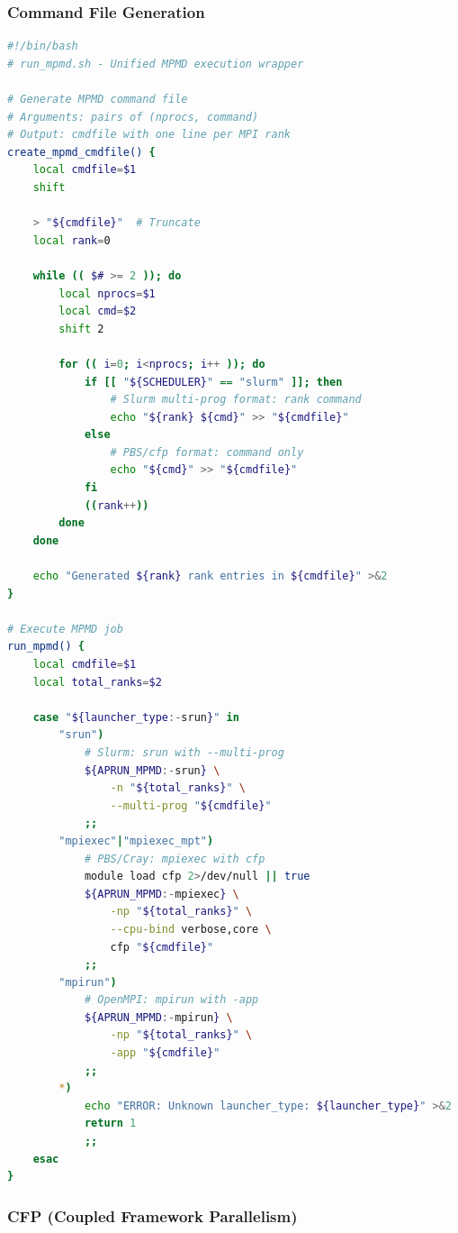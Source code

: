 \documentclass[11pt,twoside]{article}
\begin{document}
\subsubsection{Command File Generation}

\begin{lstlisting}[language=Bash, caption={\texttt{run\_mpmd.sh} Core Functions}]
#!/bin/bash
# run_mpmd.sh - Unified MPMD execution wrapper

# Generate MPMD command file
# Arguments: pairs of (nprocs, command)
# Output: cmdfile with one line per MPI rank
create_mpmd_cmdfile() {
    local cmdfile=$1
    shift
    
    > "${cmdfile}"  # Truncate
    local rank=0
    
    while (( $# >= 2 )); do
        local nprocs=$1
        local cmd=$2
        shift 2
        
        for (( i=0; i<nprocs; i++ )); do
            if [[ "${SCHEDULER}" == "slurm" ]]; then
                # Slurm multi-prog format: rank command
                echo "${rank} ${cmd}" >> "${cmdfile}"
            else
                # PBS/cfp format: command only
                echo "${cmd}" >> "${cmdfile}"
            fi
            ((rank++))
        done
    done
    
    echo "Generated ${rank} rank entries in ${cmdfile}" >&2
}

# Execute MPMD job
run_mpmd() {
    local cmdfile=$1
    local total_ranks=$2
    
    case "${launcher_type:-srun}" in
        "srun")
            # Slurm: srun with --multi-prog
            ${APRUN_MPMD:-srun} \
                -n "${total_ranks}" \
                --multi-prog "${cmdfile}"
            ;;
        "mpiexec"|"mpiexec_mpt")
            # PBS/Cray: mpiexec with cfp
            module load cfp 2>/dev/null || true
            ${APRUN_MPMD:-mpiexec} \
                -np "${total_ranks}" \
                --cpu-bind verbose,core \
                cfp "${cmdfile}"
            ;;
        "mpirun")
            # OpenMPI: mpirun with -app
            ${APRUN_MPMD:-mpirun} \
                -np "${total_ranks}" \
                -app "${cmdfile}"
            ;;
        *)
            echo "ERROR: Unknown launcher_type: ${launcher_type}" >&2
            return 1
            ;;
    esac
}
\end{lstlisting}

\subsubsection{CFP (Coupled Framework Parallelism)}
\end{document}
